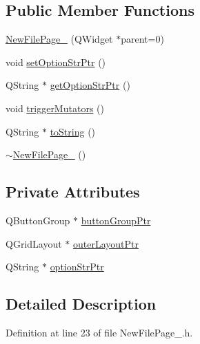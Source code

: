 \subsection*{Public Member Functions}
\begin{DoxyCompactItemize}
\item 
\hyperlink{class_new_file_page__2_ae6158d1bf5b626cd19fd6060a22f8671}{New\-File\-Page\-\_} (Q\-Widget $\ast$parent=0)
\item 
void \hyperlink{class_new_file_page__2_ae67215e94650413f3a7d7bfa7da7d383}{set\-Option\-Str\-Ptr} ()
\item 
Q\-String $\ast$ \hyperlink{class_new_file_page__2_a7245ddb93d1dd167e331d11721a80b52}{get\-Option\-Str\-Ptr} ()
\item 
void \hyperlink{class_new_file_page__2_aa680bc4e087b98dbc1d69ee918a0cd24}{trigger\-Mutators} ()
\item 
Q\-String $\ast$ \hyperlink{class_new_file_page__2_a4a92aa5885c065bde1197568a82492e5}{to\-String} ()
\item 
\hyperlink{class_new_file_page__2_ada05f10017d64e57023cc2f1320ddb55}{$\sim$\-New\-File\-Page\-\_} ()
\end{DoxyCompactItemize}
\subsection*{Private Attributes}
\begin{DoxyCompactItemize}
\item 
Q\-Button\-Group $\ast$ \hyperlink{class_new_file_page__2_a1eaed1480c571a3bb321bc13707056c8}{button\-Group\-Ptr}
\item 
Q\-Grid\-Layout $\ast$ \hyperlink{class_new_file_page__2_aeebed0ee7d06690f79843b0b926e937c}{outer\-Layout\-Ptr}
\item 
Q\-String $\ast$ \hyperlink{class_new_file_page__2_a8be9fd0cc47bdaa93967f604d8ca081a}{option\-Str\-Ptr}
\end{DoxyCompactItemize}


\subsection{Detailed Description}


Definition at line 23 of file New\-File\-Page\-\_.\-h.



